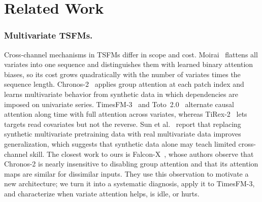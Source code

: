 \documentclass[runningheads]{llncs}
\newcommand{\tfm}{TimesFM-3}
\begin{document}
\section{Related Work}\label{sec:related}

\subsubsection{Multivariate TSFMs.}
Cross-channel mechanisms in TSFMs differ in scope and cost.
Moirai~\cite{woo2024moirai} flattens all variates into one sequence and
distinguishes them with learned binary attention biases, so its cost grows
quadratically with the number of variates times the sequence length.
Chronos-2~\cite{ansari2025chronos2} applies group attention at each patch
index and learns multivariate behavior from synthetic data in which
dependencies are imposed on univariate series. \tfm{}~\cite{timesfm3_blog2026}
and Toto~2.0~\cite{garg2026toto2} alternate causal attention along time with
full attention across variates, whereas TiRex-2~\cite{carlsen2026tirex2} lets
targets read covariates but not the reverse. Sun et al.~\cite{rmisc2026}
report that replacing synthetic multivariate pretraining data with real
multivariate data improves generalization, which suggests that synthetic data
alone may teach limited cross-channel skill. The closest work to ours is
Falcon-X~\cite{liu2026falconx}, whose authors observe that Chronos-2 is
nearly insensitive to disabling group attention and that its attention maps
are similar for dissimilar inputs. They use this observation to motivate a new
architecture; we turn it into a systematic diagnosis, apply it to \tfm, and
characterize when variate attention helps, is idle, or hurts.
\end{document}
